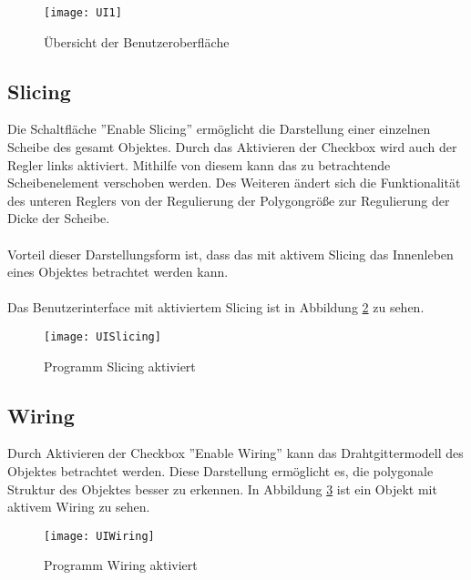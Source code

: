 \begin{figure}[H]
	\centering
	\texttt{[image: UI1]}
	\caption{Übersicht der Benutzeroberfläche}
	\label{fig:UI1}
\end{figure}
\subsection{Slicing}
\label{sec:slicing}
Die Schaltfläche ''Enable Slicing'' ermöglicht die Darstellung einer einzelnen Scheibe des gesamt Objektes. Durch das Aktivieren der Checkbox wird auch der Regler links aktiviert. Mithilfe von diesem kann das zu betrachtende Scheibenelement verschoben werden. Des Weiteren ändert sich die Funktionalität des unteren Reglers von der Regulierung der Polygongröße zur Regulierung der Dicke der Scheibe.\\
\\
Vorteil dieser Darstellungsform ist, dass das mit aktivem Slicing das Innenleben eines Objektes betrachtet werden kann.\\
\\
Das Benutzerinterface mit aktiviertem Slicing ist in Abbildung \ref{fig:UISlicing} zu sehen.
\begin{figure}[H]
	\centering
	\texttt{[image: UISlicing]}
	\caption{Programm Slicing aktiviert}
	\label{fig:UISlicing}
\end{figure}
\subsection{Wiring}
\label{sec:wiring}
Durch Aktivieren der Checkbox ''Enable Wiring'' kann das Drahtgittermodell des Objektes betrachtet werden. Diese Darstellung ermöglicht es, die polygonale Struktur des Objektes besser zu erkennen. In Abbildung \ref{fig:UIWiring} ist ein Objekt mit aktivem Wiring zu sehen.
\begin{figure}[H]
	\centering
	\texttt{[image: UIWiring]}
	\caption{Programm Wiring aktiviert}
	\label{fig:UIWiring}
\end{figure}